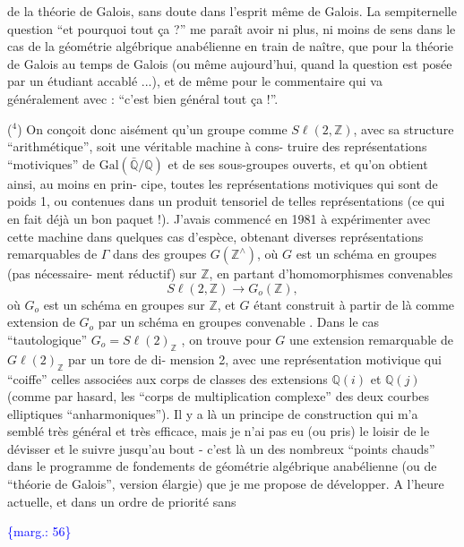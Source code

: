 \documentclass[11pt]{article}
\newcommand{\scanpage}[1]{\par\bigskip\noindent{\small\sffamily[scan #1]}\par}
\newcommand{\mspage}[1]{{\small\sffamily[p.\,#1]}}
\newcommand{\margin}[1]{\textcolor{blue}{\{\textsf{marg.:} #1\}}}
\begin{document}
de la théorie de Galois, sans doute dans l'esprit même de Galois.
La sempiternelle question ``et pourquoi tout ça ?'' me paraît avoir
ni plus, ni moins de sens dans le cas de la géométrie algébrique
anabélienne en train de naître, que pour la théorie de Galois au
temps de Galois (ou même aujourd'hui, quand la question est posée
par un étudiant accablé ...), et de même pour le commentaire qui
va généralement avec : ``c'est bien général tout ça !''.

($^4$) On conçoit donc aisément qu'un groupe comme $S\ell(2,\mathbb{Z})$, avec
sa structure ``arithmétique'', soit une véritable machine à cons-%
truire des représentations ``motiviques'' de $\mathrm{Gal}(\bar{\mathbb{Q}}/\mathbb{Q})$ et de ses
sous-groupes ouverts, et qu'on obtient ainsi, au moins en prin-%
cipe, toutes les représentations motiviques qui sont de poids 1,
ou contenues dans un produit tensoriel de telles représentations
(ce qui en fait déjà un bon paquet !). J'avais commencé en 1981
à expérimenter avec cette machine dans quelques cas d'espèce,
obtenant diverses représentations remarquables de $\Gamma$ dans des
groupes $G(\mathbb{Z}^{\wedge})$, où $G$ est un schéma en groupes (pas nécessaire-%
ment réductif) sur $\mathbb{Z}$, en partant d'homomorphismes convenables
\[ S\ell(2,\mathbb{Z}) \longrightarrow G_o(\mathbb{Z}) , \]
où $G_o$ est un schéma en groupes sur $\mathbb{Z}$, et $G$ étant construit
à partir de là comme extension de $G_o$ par un schéma en groupes
convenable . Dans le cas ``tautologique'' $G_o = S\ell(2)_{\mathbb{Z}}$ , on trouve
pour $G$ une extension remarquable de $G\ell(2)_{\mathbb{Z}}$ par un tore de di-%
mension 2, avec une représentation motivique qui ``coiffe'' celles
associées aux corps de classes des extensions $\mathbb{Q}(i)$ et $\mathbb{Q}(j)$
(comme par hasard, les ``corps de multiplication complexe'' des deux
courbes elliptiques ``anharmoniques''). Il y a là un principe de
construction qui m'a semblé très général et très efficace, mais
je n'ai pas eu (ou pris) le loisir de le dévisser et le suivre
jusqu'au bout - c'est là un des nombreux ``points chauds'' dans le
programme de fondements de géométrie algébrique anabélienne (ou
de ``théorie de Galois'', version élargie) que je me propose de
développer. A l'heure actuelle, et dans un ordre de priorité sans

\margin{56}

\clearpage
\scanpage{119/57}
\mspage{55}
\end{document}
